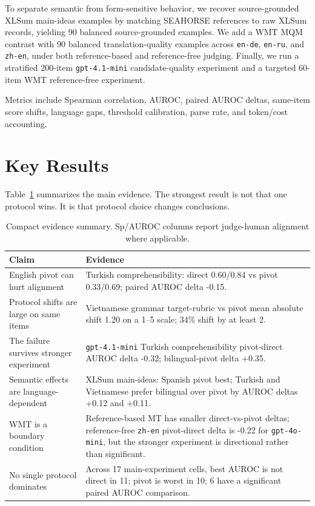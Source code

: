 \documentclass[10pt,twocolumn]{article}
\begin{document}
To separate semantic from form-sensitive behavior, we recover source-grounded XLSum \cite{hasan2021xlsum} main-ideas examples by matching SEAHORSE references to raw XLSum records, yielding 90 balanced source-grounded examples. We add a WMT MQM contrast with 90 balanced translation-quality examples across \texttt{en-de}, \texttt{en-ru}, and \texttt{zh-en}, under both reference-based and reference-free judging. Finally, we run a stratified 200-item \texttt{gpt-4.1-mini} candidate-quality experiment and a targeted 60-item WMT reference-free experiment.

Metrics include Spearman correlation, AUROC, paired AUROC deltas, same-item score shifts, language gaps, threshold calibration, parse rate, and token/cost accounting.

\section{Key Results}
Table~\ref{tab:key_results} summarizes the main evidence. The strongest result is not that one protocol wins. It is that protocol choice changes conclusions.

\begin{table}[t]
\centering
\footnotesize
\caption{Compact evidence summary. Sp/AUROC columns report judge-human alignment where applicable.}
\label{tab:key_results}
\begin{tabular}{>{\raggedright\arraybackslash}p{}>{\raggedright\arraybackslash}p{}}
\toprule
Claim & Evidence \\
\midrule
English pivot can hurt alignment & Turkish comprehensibility: direct 0.60/0.84 vs pivot 0.33/0.69; paired AUROC delta -0.15. \\
Protocol shifts are large on same items & Vietnamese grammar target-rubric vs pivot mean absolute shift 1.20 on a 1--5 scale; 34\% shift by at least 2. \\
The failure survives stronger experiment & \texttt{gpt-4.1-mini} Turkish comprehensibility pivot-direct AUROC delta -0.32; bilingual-pivot delta +0.35. \\
Semantic effects are language-dependent & XLSum main-ideas: Spanish pivot best; Turkish and Vietnamese prefer bilingual over pivot by AUROC deltas +0.12 and +0.11. \\
WMT is a boundary condition & Reference-based MT has smaller direct-vs-pivot deltas; reference-free \texttt{zh-en} pivot-direct delta is -0.22 for \texttt{gpt-4o-mini}, but the stronger experiment is directional rather than significant. \\
No single protocol dominates & Across 17 main-experiment cells, best AUROC is not direct in 11; pivot is worst in 10; 6 have a significant paired AUROC comparison. \\
\bottomrule
\end{tabular}
\end{table}
\end{document}
